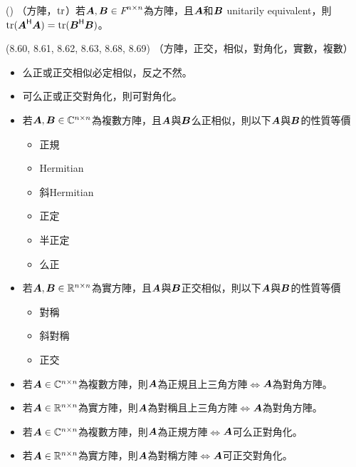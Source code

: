\item \begin{theorem}{()} （方陣，$\operatorname{tr}$）若$\boldsymbol{A}, \boldsymbol{B} \in \textit{F}^{n \times n}$為方陣，且$\boldsymbol{A}$和$\boldsymbol{B}$ unitarily equivalent，則$\operatorname{tr}(\boldsymbol{A}^{\mathsf{H}}\boldsymbol{A}) = \operatorname{tr}(\boldsymbol{B}^{\mathsf{H}}\boldsymbol{B})$。
\end{theorem}

\item \begin{theorem}{(8.60, 8.61, 8.62, 8.63, 8.68, 8.69)} （方陣，正交，相似，對角化，實數，複數）
	\begin{itemize}
		\item 么正或正交相似必定相似，反之不然。
		\item 可么正或正交對角化，則可對角化。
		\item 若$\boldsymbol{A}, \boldsymbol{B} \in \mathbb{C}^{n \times n}$為複數方陣，且$\boldsymbol{A}$與$\boldsymbol{B}$么正相似，則以下$\boldsymbol{A}$與$\boldsymbol{B}$的性質等價
			\begin{itemize}
				\item 正規
				\item Hermitian
				\item 斜Hermitian
				\item 正定
				\item 半正定
				\item 么正
			\end{itemize}
		\item 若$\boldsymbol{A}, \boldsymbol{B} \in \mathbb{R}^{n \times n}$為實方陣，且$\boldsymbol{A}$與$\boldsymbol{B}$正交相似，則以下$\boldsymbol{A}$與$\boldsymbol{B}$的性質等價
		\begin{itemize}
			\item 對稱
			\item 斜對稱
			\item 正交
		\end{itemize}
		\item 若$\boldsymbol{A} \in \mathbb{C}^{n \times n}$為複數方陣，則$\boldsymbol{A}$為正規且上三角方陣$\iff$$\boldsymbol{A}$為對角方陣。
		\item 若$\boldsymbol{A} \in \mathbb{R}^{n \times n}$為實方陣，則$\boldsymbol{A}$為對稱且上三角方陣$\iff$$\boldsymbol{A}$為對角方陣。
		\item 若$\boldsymbol{A} \in \mathbb{C}^{n \times n}$為複數方陣，則$\boldsymbol{A}$為正規方陣$\iff$$\boldsymbol{A}$可么正對角化。
		\item 若$\boldsymbol{A} \in \mathbb{R}^{n \times n}$為實方陣，則$\boldsymbol{A}$為對稱方陣$\iff$$\boldsymbol{A}$可正交對角化。
	\end{itemize}
\end{theorem}

